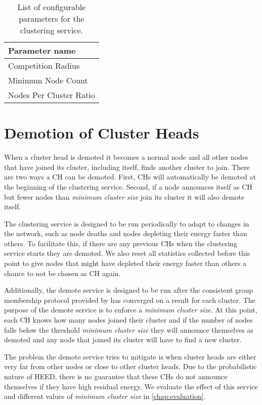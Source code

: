 \begin{table}[bt]
\centering
\caption{List of configurable parameters for the clustering service.}
\label{table:configuration-parameters}
\begin{tabular}{l}
\textbf{Parameter name}      \\ \hline
Competition Radius      \\
Minimum Node Count      \\
Nodes Per Cluster Ratio
\end{tabular}
\end{table}

\section{Demotion of Cluster Heads}
\label{sec:demoting-cluster-heads}
When a cluster head is demoted it becomes a normal node and all other nodes that have joined its cluster, including itself, finds another cluster to join. There are two ways a CH can be demoted.  First, CHs will automatically be demoted at the beginning of the clustering service. Second, if a node announces itself as CH but fewer nodes than \emph{minimum cluster size} join its cluster it will also demote itself.

The clustering service is designed to be run periodically to adapt to changes in the network, such as node deaths and nodes depleting their energy faster than others. To facilitate this, if there are any previous CHs when the clustering service starts they are demoted. We also reset all statistics collected before this point to give nodes that might have depleted their energy faster than others a chance to not be chosen as CH again.  

Additionally, the demote service is designed to be run after the consistent group membership protocol provided by \atwo{} \cite{a2-introduction-paper} has converged on a result for each cluster. The purpose of the demote service is to enforce a \emph{minimum cluster size}. At this point, each CH knows how many nodes joined their cluster and if the number of nodes falls below the threshold \emph{minimum cluster size} they will announce themselves as demoted and any node that joined its cluster will have to find a new cluster.

The problem the demote service tries to mitigate is when cluster heads are either very far from other nodes or close to other cluster heads. Due to the probabilistic nature of HEED, there is no guarantee that these CHs do not announce themselves if they have high residual energy. We evaluate the effect of this service and different values of \emph{minimum cluster size} in \cref{chap:evaluation}.


